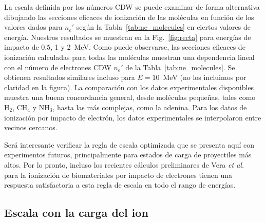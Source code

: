 La escala definida por los números CDW se puede examinar de forma 
alternativa dibujando las secciones eficaces de ionización de las 
moléculas en función de los valores dados para $n_e'$ según la 
Tabla~\ref{tab:ne_molecules} en ciertos valores de energía. Nuestros 
resultados se muestran en la Fig.~\ref{fig:recta} para energías de 
impacto de $0.5$, 1 y 2~MeV. Como puede observarse, las secciones 
eficaces de ionización calculadas para todas las moléculas muestran 
una dependencia lineal con el número de electrones CDW $n_e'$ de la 
Tabla~\ref{tab:ne_molecules}. Se obtienen resultados similares incluso 
para $E=10$~MeV (no los incluimos por claridad en la figura). La 
comparación con los datos experimentales disponibles muestra una buena 
concordancia general, desde moléculas pequeñas, tales como H$_2$, CH$_4$ 
y NH$_3$, hasta las más complejas, como la adenina. Para los datos de 
ionización por impacto de electrón, los datos experimentales se 
interpolaron entre vecinos cercanos. 

Será interesante verificar la regla de escala optimizada que se presenta
aquí con experimentos futuros, principalmente para estados de carga de 
proyectiles más altos. Por lo pronto, incluso los recientes cálculos 
preliminares de Vera \textit{et al.}~\cite{deVera:20} para la ionización 
de biomateriales por impacto de electrones tienen una respuesta 
satisfactoria a esta regla de escala en todo el rango de energías.



\subsection{Escala con la carga del ion}
\label{sec:zscaling}

